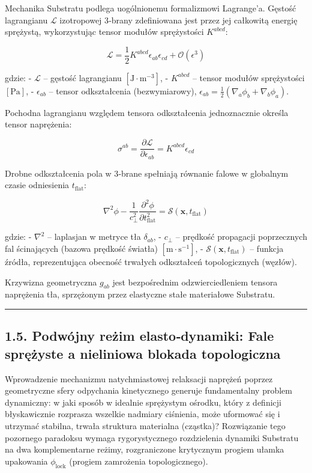 \documentclass[
  letterpaper,
  DIV=11,
  numbers=noendperiod]{scrartcl}
\numberwithin{equation}{subsection}
\begin{document}
Mechanika Substratu podlega uogólnionemu formalizmowi Lagrange'a.
Gęstość lagrangianu \(\mathcal{L}\) izotropowej 3‑brany zdefiniowana
jest przez jej całkowitą energię sprężystą, wykorzystując tensor modułów
sprężystości \(K^{abcd}\):

\[\mathcal{L} = \frac{1}{2} K^{abcd} \epsilon_{ab} \epsilon_{cd} + \mathcal{O}(\epsilon^3) \tag{1.4.1}\]

gdzie: - \(\mathcal{L}\) -- gęstość lagrangianu
\([\text{J} \cdot \text{m}^{-3}]\), - \(K^{abcd}\) -- tensor modułów
sprężystości \([\text{Pa}]\), - \(\epsilon_{ab}\) -- tensor
odkształcenia (bezwymiarowy),
\(\epsilon_{ab} = \frac{1}{2}(\nabla_a \phi_b + \nabla_b \phi_a)\).

Pochodna lagrangianu względem tensora odkształcenia jednoznacznie
określa tensor naprężenia:

\[\sigma^{ab} = \frac{\partial \mathcal{L}}{\partial \epsilon_{ab}} = K^{abcd} \epsilon_{cd} \tag{1.4.2}\]

Drobne odkształcenia pola w 3‑brane spełniają równanie falowe w
globalnym czasie odniesienia \(t_{\text{flat}}\):

\[\nabla^2 \phi - \frac{1}{c_{\perp}^2} \frac{\partial^2 \phi}{\partial t_{\text{flat}}^2} = \mathcal{S}(\mathbf{x}, t_{\text{flat}}) \tag{1.4.3}\]

gdzie: - \(\nabla^2\) -- laplasjan w metryce tła \(\delta_{ab}\), -
\(c_{\perp}\) -- prędkość propagacji poprzecznych fal ścinających
(bazowa prędkość światła) \([\text{m} \cdot \text{s}^{-1}]\), -
\(\mathcal{S}(\mathbf{x}, t_{\text{flat}})\) -- funkcja źródła,
reprezentująca obecność trwałych odkształceń topologicznych (węzłów).

Krzywizna geometryczna \(g_{ab}\) jest bezpośrednim odzwierciedleniem
tensora naprężenia tła, sprzężonym przez elastyczne stałe materiałowe
Substratu.

\begin{center}\rule{0.5\linewidth}{0.5pt}\end{center}

\subsection{1.5. Podwójny reżim elasto‑dynamiki: Fale sprężyste a
nieliniowa blokada
topologiczna}\label{podwuxf3jny-reux17cim-elastodynamiki-fale-sprux119ux17cyste-a-nieliniowa-blokada-topologiczna}

Wprowadzenie mechanizmu natychmiastowej relaksacji naprężeń poprzez
geometryczne sfery odpychania kinetycznego generuje fundamentalny
problem dynamiczny: w jaki sposób w idealnie sprężystym ośrodku, który z
definicji błyskawicznie rozprasza wszelkie nadmiary ciśnienia, może
uformować się i utrzymać stabilna, trwała struktura materialna
(cząstka)? Rozwiązanie tego pozornego paradoksu wymaga rygorystycznego
rozdzielenia dynamiki Substratu na dwa komplementarne reżimy,
rozgraniczone krytycznym progiem ułamka upakowania
\(\phi_{\text{lock}}\) (progiem zamrożenia topologicznego).
\end{document}
